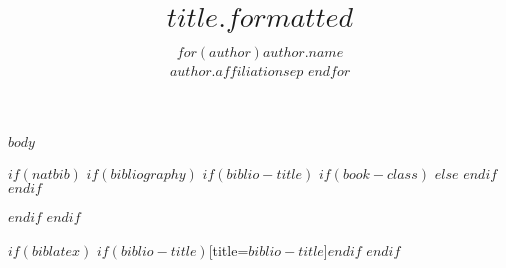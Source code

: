 \documentclass[12pt,a4paper, twoside=true, BCOR=5mm]{scrbook}
\author{
$for(author)$$author.name$\\$author.affiliation$$sep$ \And $endfor$
}
\title{$title.formatted$}
\begin{document}
$body$

$if(natbib)$
$if(bibliography)$
$if(biblio-title)$
$if(book-class)$
\renewcommand\bibname{$biblio-title$}
$else$
\renewcommand\refname{$biblio-title$}
$endif$
$endif$

$endif$
$endif$

$if(biblatex)$
\printbibliography$if(biblio-title)$[title=$biblio-title$]$endif$
$endif$
\end{document}
